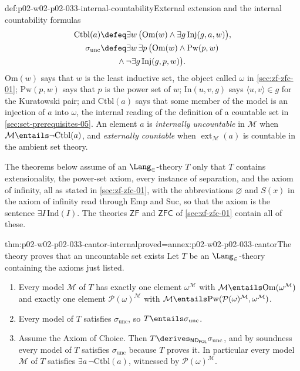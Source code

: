 \begin{hbdefinition}{def:p02-w02-p02-033-internal-countability}{External extension and the internal countability formulas}
\[\begin{aligned}
 \mathrm{Ctbl}(a)&\defeq\exists w\,\bigl(\mathrm{Om}(w)\land\exists g\,\mathrm{Inj}(g,a,w)\bigr),\\
 \sigma_{\mathrm{unc}}&\defeq\exists w\,\exists p\,
   \bigl(\mathrm{Om}(w)\land\mathrm{Pw}(p,w)\\
 &\qquad\land\neg\exists g\,\mathrm{Inj}(g,p,w)\bigr).
\end{aligned}
\]
\(\mathrm{Om}(w)\) says that \(w\) is the least inductive set, the object
called \(\omega\) in \cref{sec:zf-zfc-01}; \(\mathrm{Pw}(p,w)\) says that
\(p\) is the power set of \(w\); \(\mathrm{In}(u,v,g)\) says
\(\langle u,v\rangle\in g\) for the Kuratowski pair; and
\(\mathrm{Ctbl}(a)\) says that some member of the model is an injection of
\(a\) into \(\omega\), the internal reading of the definition of a countable
set in \cref{sec:set-prerequisites-05}.  An element \(a\) is
\emph{internally uncountable} in \(\mathcal M\) when
\(\mathcal M\entails\neg\mathrm{Ctbl}(a)\), and \emph{externally countable}
when \(\operatorname{ext}_{\mathcal M}(a)\) is countable in the ambient set
theory.
\end{hbdefinition}

The theorems below assume of an \(\Lang_{\in}\)-theory \(T\) only that
\(T\) contains extensionality, the power-set axiom, every instance of
separation, and the axiom of infinity, all as stated in
\cref{sec:zf-zfc-01}, with the abbreviations \(\varnothing\) and \(S(x)\) in
the axiom of infinity read through \(\mathrm{Emp}\) and \(\mathrm{Suc}\), so
that the axiom is the sentence \(\exists I\,\mathrm{Ind}(I)\).  The theories
\(\mathsf{ZF}\) and \(\mathsf{ZFC}\) of \cref{sec:zf-zfc-01} contain all of
these.

\begin{hbtheorem}{thm:p02-w02-p02-033-cantor-internal}{proved=annex:p02-w02-p02-033-cantor}{The theory proves that an uncountable set exists}
Let \(T\) be an \(\Lang_{\in}\)-theory containing the axioms just listed.
\begin{enumerate}
  \item Every model \(\mathcal M\) of \(T\) has exactly one element
        \(\omega^{\mathcal M}\) with
        \(\mathcal M\entails\mathrm{Om}(\omega^{\mathcal M})\) and exactly
        one element \(\mathcal P(\omega)^{\mathcal M}\) with
        \(\mathcal M\entails
        \mathrm{Pw}(\mathcal P(\omega)^{\mathcal M},\omega^{\mathcal M})\).
  \item Every model of \(T\) satisfies \(\sigma_{\mathrm{unc}}\), so
        \(T\entails\sigma_{\mathrm{unc}}\).
  \item Assume the Axiom of Choice.  Then
        \(T\derives_{\mathsf{ND}_{\mathsf{FOL}}}\sigma_{\mathrm{unc}}\), and
        by soundness every model of \(T\) satisfies
        \(\sigma_{\mathrm{unc}}\) because \(T\) proves it.  In particular
        every model \(\mathcal M\) of \(T\) satisfies
        \(\exists a\,\neg\mathrm{Ctbl}(a)\), witnessed by
        \(\mathcal P(\omega)^{\mathcal M}\).
\end{enumerate}
\end{hbtheorem}

